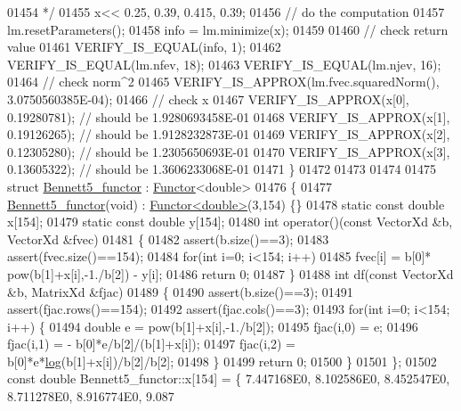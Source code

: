 \begin{DoxyCode}
01454 \textcolor{comment}{   */}
01455   x<< 0.25, 0.39, 0.415, 0.39;
01456   \textcolor{comment}{// do the computation}
01457   lm.resetParameters();
01458   info = lm.minimize(x);
01459 
01460   \textcolor{comment}{// check return value}
01461   VERIFY\_IS\_EQUAL(info, 1);
01462   VERIFY\_IS\_EQUAL(lm.nfev, 18);
01463   VERIFY\_IS\_EQUAL(lm.njev, 16);
01464   \textcolor{comment}{// check norm^2}
01465   VERIFY\_IS\_APPROX(lm.fvec.squaredNorm(), 3.0750560385E-04);
01466   \textcolor{comment}{// check x}
01467   VERIFY\_IS\_APPROX(x[0], 0.19280781); \textcolor{comment}{// should be 1.9280693458E-01}
01468   VERIFY\_IS\_APPROX(x[1], 0.19126265); \textcolor{comment}{// should be 1.9128232873E-01}
01469   VERIFY\_IS\_APPROX(x[2], 0.12305280); \textcolor{comment}{// should be 1.2305650693E-01}
01470   VERIFY\_IS\_APPROX(x[3], 0.13605322); \textcolor{comment}{// should be 1.3606233068E-01}
01471 \}
01472 
01473 
01474 
01475 \textcolor{keyword}{struct }\hyperlink{struct_bennett5__functor}{Bennett5\_functor} : \hyperlink{struct_functor}{Functor}<double>
01476 \{
01477     \hyperlink{struct_bennett5__functor}{Bennett5\_functor}(\textcolor{keywordtype}{void}) : \hyperlink{struct_functor}{Functor<double>}(3,154) \{\}
01478     \textcolor{keyword}{static} \textcolor{keyword}{const} \textcolor{keywordtype}{double} x[154];
01479     \textcolor{keyword}{static} \textcolor{keyword}{const} \textcolor{keywordtype}{double} y[154];
01480     \textcolor{keywordtype}{int} operator()(\textcolor{keyword}{const} VectorXd &b, VectorXd &fvec)
01481     \{
01482         assert(b.size()==3);
01483         assert(fvec.size()==154);
01484         \textcolor{keywordflow}{for}(\textcolor{keywordtype}{int} i=0; i<154; i++)
01485             fvec[i] = b[0]* pow(b[1]+x[i],-1./b[2]) - y[i];
01486         \textcolor{keywordflow}{return} 0;
01487     \}
01488     \textcolor{keywordtype}{int} df(\textcolor{keyword}{const} VectorXd &b, MatrixXd &fjac)
01489     \{
01490         assert(b.size()==3);
01491         assert(fjac.rows()==154);
01492         assert(fjac.cols()==3);
01493         \textcolor{keywordflow}{for}(\textcolor{keywordtype}{int} i=0; i<154; i++) \{
01494             \textcolor{keywordtype}{double} e = pow(b[1]+x[i],-1./b[2]);
01495             fjac(i,0) = e;
01496             fjac(i,1) = - b[0]*e/b[2]/(b[1]+x[i]);
01497             fjac(i,2) = b[0]*e*\hyperlink{structlog}{log}(b[1]+x[i])/b[2]/b[2];
01498         \}
01499         \textcolor{keywordflow}{return} 0;
01500     \}
01501 \};
01502 \textcolor{keyword}{const} \textcolor{keywordtype}{double} Bennett5\_functor::x[154] = \{ 7.447168E0, 8.102586E0, 8.452547E0, 8.711278E0, 8.916774E0, 9.087

\end{DoxyCode}
